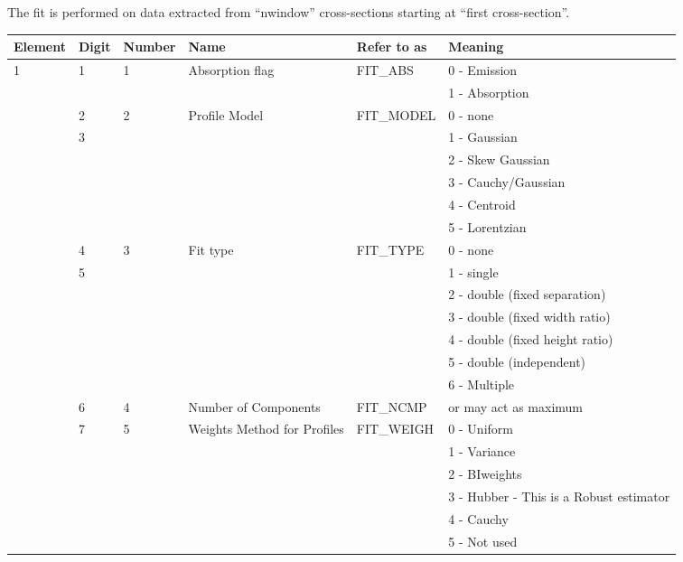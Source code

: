 The fit is performed on data extracted from ``nwindow'' cross-sections
starting at ``first cross-section''.

\begin{table}[ht]
\small
\begin{center}
\tiny
\begin{tabular}{|l|l|l|l|l|l|} \hline
Element & Digit & Number & Name & Refer to as &Meaning\\ \hline
1 & 1 & 1 & Absorption flag & FIT\_ABS & 0 - Emission\\
  &   &   &                 & & 1 - Absorption\\ \cline{2-6}
  & 2 & 2 & Profile Model & FIT\_MODEL & 0 - none\\
  & 3 &   &               &            & 1 - Gaussian\\
  &   &   &               &            & 2 - Skew Gaussian\\
  &   &   &               &            & 3 - Cauchy/Gaussian\\
  &   &   &               &            & 4 - Centroid\\
  &   &   &               &            & 5 - Lorentzian\\ \cline{2-6}
  & 4 & 3 & Fit type      & FIT\_TYPE & 0 - none \\
  & 5 &   &               &           & 1 - single \\
  &   &   &               &           & 2 - double (fixed separation) \\
  &   &   &               &          & 3 - double (fixed width ratio) \\
  &   &   &               &         & 4 - double (fixed height ratio) \\
  &   &   &               &           & 5 - double (independent) \\
  &   &   &               &           & 6 - Multiple \\ \cline{2-6}
  & 6 & 4 & Number of Components & FIT\_NCMP & or may act as maximum\\
\cline{2-6}
  & 7 & 5 & Weights Method for Profiles & FIT\_WEIGH & 0 - Uniform\\
  &   &   & & & 1 - Variance\\
  &   &   & & & 2 - BIweights\\
  &   &   & & & 3 - Hubber - This is a Robust estimator\\
  &   &   & & & 4 - Cauchy\\
  &   &   & & & 5 - Not used \\

\end{tabular}
\end{center}
\end{table}
